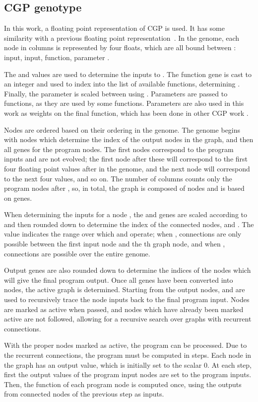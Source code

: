 \documentclass[sigconf,screen]{acmart}\settopmatter{printfolios=true,printacmref=false}
\begin{document}
\subsection{CGP genotype}

In this work, a floating point representation of CGP is used. It has some
similarity with a previous floating point representation~\cite{Clegg2007}. In
the genome, each node  in  columns is represented by four floats, which
are all bound between :  input,  input, function, parameter
.

The  and  values are used to determine the inputs to . The function
gene is cast to an integer and used to index into the list of available
functions, determining . Finally, the parameter is scaled between  using . Parameters are passed to functions, as they are
used by some functions. Parameters are also used in this work as weights on the
final function, which has been done in other CGP work \cite{Knezevic2017}.

Nodes are ordered based on their ordering in the genome. The genome begins with
 nodes which determine the index of the output nodes in the graph,
and then all genes for the  program nodes. The first  nodes
correspond to the program inputs and are not evolved; the first node after these
will correspond to the first four floating point values after  in
the genome, and the next node will correspond to the next four values, and so
on. The number of columns  counts only the program nodes after ,
so, in total, the graph is composed of  nodes and is based on
 genes.

When determining the inputs for a node , the  and  genes are scaled
according to  and then rounded down to determine the index of the connected
nodes,  and . The value  indicates the range over which  and
 operate; when , connections are only possible between the first input
node and the th graph node, and when , connections are possible over the
entire genome.



Output genes are also rounded down to determine the indices of the nodes which
will give the final program output. Once all genes have been converted into
nodes, the active graph is determined. Starting from the output nodes, 
and  are used to recursively trace the node inputs back to the final
program input. Nodes are marked as active when passed, and nodes which have
already been marked active are not followed, allowing for a recursive search
over graphs with recurrent connections.

With the proper nodes marked as active, the program can be processed. Due to the
recurrent connections, the program must be computed in steps. Each node in the
graph has an output value, which is initially set to the scalar 0. At each step,
first the output values of the program input nodes are set to the program
inputs. Then, the function of each program node is computed once, using the outputs
from connected nodes of the previous step as inputs.
\end{document}
